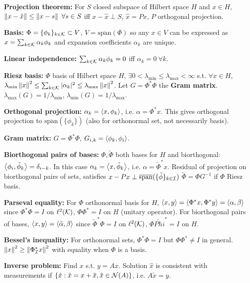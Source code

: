 \documentclass{article}
\begin{document}
\begin{multicols*}{3}
    \textbf{Projection theorem: }For $S$ closed subspace of Hilbert space $H$ and $x\in H$, $\left\lVert x-\hat{x}\right\rVert\leq \left\lVert x-s\right\rVert\ \forall s\in S$ iff $x-\hat{x} \perp S$, $\hat{x}=Px$, $P$ orthogonal projection.
    
    \textbf{Basis: }$\Phi=\{\phi_k\}_{k\in\mathcal{K}}\subset V$, $V=\overline{\text{span}}(\Phi)$ so any $x\in V$ can be expressed as $x=\sum_{k\in \mathcal{K}}\alpha_k\phi_k$ and expansion coefficients $\alpha_k$ are unique.
    
    \textbf{Linear independence: }$\sum_{k\in \mathcal{K}}\alpha_k \phi_k=0$ iff $\alpha_k=0\ \forall k$.
    
    \textbf{Riesz basis: }$\Phi$ basis of Hilbert space $H$, $\exists 0 < \lambda_{\min} \leq \lambda_{\max} < \infty$ s.t. $\forall x \in H$, $\lambda_{\min} \left\lVert x\right\rVert^2\leq \sum_{k\in \mathcal{K}}|\alpha_k|^2 \leq \lambda_{\max} \left\lVert x\right\rVert^2$. Let $G=\Phi^*\Phi$ the \textbf{Gram matrix}. $\lambda_{\max}(G)=1/\lambda_{\min}$, $\lambda_{\min}(G)=1/\lambda_{\max}$.
    
    \textbf{Orthogonal projection: }$\alpha_k=\left\langle x,\phi_k \right\rangle$, i.e. $\alpha = \Phi^*x$. This gives orthogonal projection to $\overline{\text{span}}(\{\phi_k\})$ (also for orthonormal set, not necessarily basis).
    
    \textbf{Gram matrix: }$G=\Phi^*\Phi$, $G_{i,k}=\left\langle \phi_k,\phi_i \right\rangle$.
    
    \textbf{Biorthogonal pairs of bases: }$\Phi,\tilde{\Phi}$ both bases for $H$ and biorthogonal: $\left\langle \phi_i,\tilde{\phi}_k \right\rangle=\delta_{i-k}$. In this case $\alpha_k = \left\langle x,\tilde{\phi}_k \right\rangle$, i.e. $\alpha = \tilde{\Phi}^*x$. Residual of projection on biorthogonal pairs of sets, satisfies $x-Px\perp \overline{\text{span}}(\{\tilde{\phi}\}_{k\in\mathcal{I}})$ $\tilde{\Phi}=\Phi G^{-1}$ if $\Phi$ Riesz basis.
    
    \textbf{Parseval equality: }For $\Phi$ orthonormal basis for $H$, $\left\langle x,y \right\rangle=\left\langle \Phi^*x,\Phi^*y \right\rangle=\left\langle \alpha,\beta \right\rangle$ since $\Phi^*\Phi=I$ on $\ell^2(\mathcal{K})$, $\Phi\Phi^*=I$ on $H$ (unitary operator). For biorthogonal pairs of bases, $\left\langle x,y \right\rangle=\left\langle \tilde{\alpha},\beta \right\rangle$ since $\tilde{\Phi}^*\Phi=I$ on $\ell^2(\mathcal{K})$, $\Phi\tilde{Phi}^*=I$ on $H$. 
    
    \textbf{Bessel's inequality: }For orthonormal sets, $\Phi^*\Phi=I$ but $\Phi\Phi^*\neq I$ in general. $\left\lVert x\right\rVert^2\geq \left\lVert\Phi_{\mathcal{I}}^* x\right\rVert^2$ with equality when $\Phi$ is a basis.
            
    \textbf{Inverse problem: }Find $x$ s.t. $y=Ax$. Solution $\hat{x}$ is consistent with measurements if $\{\hat{x}:\hat{x}=x+\tilde{x},\tilde{x}\in \mathcal{N}(A)\}$, i.e. $A\tilde{x}=y$.
    

\end{multicols*}
\end{document}

